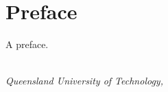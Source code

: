 \chapter*{Preface}

A preface.

\begin{flushright}
{\makeatletter\itshape
    \ifdefvoid{\@author@short}{\@author}{\@author@short} \\
    Queensland University of Technology, \monthname{} \the\year{}
\makeatother}
\end{flushright}
